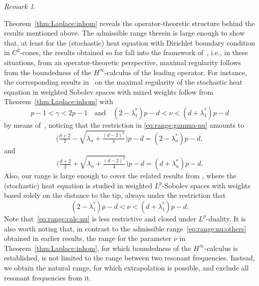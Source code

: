 \documentclass[12pt,a4paper, reqno]{amsart}
\theoremstyle{plain}
\theoremstyle{definition}
\theoremstyle{remark}
\newtheorem{remark}[theorem]{Remark}
\numberwithin{equation}{section}
\newcommand{\1}{\mathbbm{1}}
\begin{document}
\begin{remark}
\begin{enumerate}[\textup{(\roman*)}]
Theorem~\ref{thm:Laplace:inhom} reveals the operator-theoretic structure behind the results mentioned above. 
The admissible range therein is large enough to show that, at least for the (stochastic) heat equation with Dirichlet boundary condition in $C^2$-cones, the results obtained so far fall into the framework of~\cite{NeeVerWei2012}, i.e., in these situations, from an operator-theoretic perspective, maximal regularity follows from the boundedness of the $H^\infty$-calculus of the leading operator.
For instance, the corresponding results in~\cite{KimLeeSeo2021,KimLeeSeo2022b} on the maximal regularity of the stochastic heat equation in weighted Sobolev spaces with mixed weights follow from Theorem~\ref{thm:Laplace:inhom} with 
\begin{equation}\label{eq:range:gamma-nu:KimLeeSeo}
p-1<\gamma<2p-1
\quad\text{and}\quad
(2-\lambda^*_1)p-d <\nu<(d+\lambda_1^*)p-d
\end{equation}
by means of~\cite{NeeVerWei2012},
noticing that the restriction in \eqref{eq:range:gamma-nu} amounts to
\[\Big(\tfrac{d+2}{2}-\sqrt{\lambda_n+\tfrac{(d-2)^2}{4}}\Big)p-d = (2-\lambda^*_n)p-d,\]
and 
\[\Big(\tfrac{d+2}{2}+\sqrt{\lambda_n+\tfrac{(d-2)^2}{4}}\Big)p-d = (d+\lambda^*_n)p-d.\]
Also, our range is large enough to cover the related results from
\cite{Nazarov2001,Prss2007HinftycalculusFT,CioKimKyeLeeLin2018,CioKimLee2019,Cio20,LoristVeraar2021}, where the (stochastic) heat equation is studied in weighted $L^p$-Sobolev spaces with weights based solely on the distance to the tip, always under the restriction that
\begin{equation}\label{eq:range:nu:others}
(2-\lambda^*_1)p-d <\nu<(d+\lambda_1^*)p-d.
\end{equation}
Note that~\eqref{eq:range:calc:nu} is less restrictive and closed under $L^p$-duality.
It is also worth noting that, in contrast to the admissible range~\eqref{eq:range:nu:others} obtained in earlier results, the  range for the parameter $\nu$ in Theorem~\ref{thm:Laplace:inhom}, for which boundedness of the $H^\infty$-calculus is established, is not limited to the range between two resonant frequencies. Instead, we obtain the natural range, for which extrapolation is possible, and exclude all resonant frequencies from it.


\end{enumerate}
\end{remark}
\end{document}
